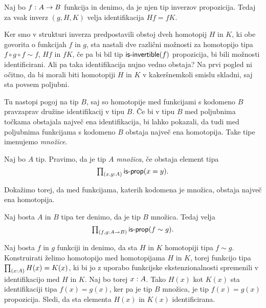 \begin{trditev}
  \label{inv-prop-coherence}
  Naj bo \(f \,\colon A \to B\) funkcija in denimo, da je njen tip inverzov propozicija. Tedaj za vsak inverz \((g, H, K)\) velja identifikacija \(Hf = fK\).
\end{trditev}


Ker smo v strukturi inverza predpostavili obstoj dveh homotopij \(H\) in \(K\), ki obe govorita o funkcijah \(f\) in \(g\), sta nastali dve različni možnosti za homotopijo tipa \(f \circ g \circ f \sim f\), \(Hf\) in \(fK\), če pa bi bil tip \(\textnormal{\textsf{is-invertible}}(f)\) propozicija, bi bili možnosti identificirani. Ali pa taka identifikacija nujno vedno obstaja? Na prvi pogled ni očitno, da bi morali biti homotopiji \(H\) in \(K\) v kakeršnemkoli smislu skladni, saj sta povsem poljubni.

Tu nastopi pogoj na tip \(B\), saj so homotopije med funkcijami s kodomeno \(B\) pravzaprav družine identifikacij v tipu \(B\). Če bi v tipu \(B\) med poljubnima točkama obstajala največ ena identifikacija, bi lahko pokazali, da tudi med poljubnima funkcijama s kodomeno \(B\) obstaja največ ena homotopija. Take tipe imenujemo \emph{množice}.

\begin{definicija}
  Naj bo \(A\) tip. Pravimo, da je tip \(A\) \emph{množica}, če obstaja element tipa
  \[\textstyle \prod_{\left( x, y : A \right)} \textnormal{\textsf{is-prop}}(x = y).\]
\end{definicija}

Dokažimo torej, da med funkcijama, katerih kodomena je množica, obstaja največ ena homotopija.

\begin{trditev}
  \label{is-prop-htpy-set}
  Naj bosta \(A\) in \(B\) tipa ter denimo, da je tip \(B\) množica. Tedaj velja
  \[\textstyle \prod_{\left( f, g : A \to B \right)} \textnormal{\textsf{is-prop}}(f \sim g).\]
\end{trditev}

\begin{dokaz}
  Naj bosta \(f\) in \(g\) funkciji in denimo, da sta \(H\) in \(K\) homotopiji tipa \(f \sim g\). Konstruirati želimo homotopijo med homotopijama \(H\) in \(K\), torej funkcijo tipa
  \(\textstyle \prod_{\left( x : A \right)} H(x) = K(x)\), ki bi jo z uporabo funkcijske ekstenzionalnosti spremenili v identifikacijo med \(H\) in \(K\). Naj bo torej \(x : A\).
  Tako \(H(x)\) kot \(K(x)\) sta identifikaciji tipa \(f(x) = g(x)\), ker pa je tip \(B\) množica, je tip \(f(x) = g(x)\) propozicija. Sledi, da sta elementa \(H(x)\) in \(K(x)\) identificirana.
\end{dokaz}

